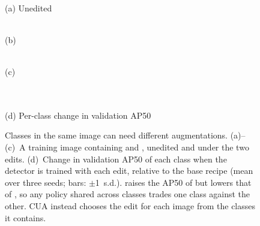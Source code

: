\begin{figure}[t]
\centering
\setlength{\fboxsep}{0pt}
\begin{minipage}[t]{0.32\columnwidth}\centering
{}\\[1pt]
{\footnotesize (a) Unedited}
\end{minipage}\hfill
\begin{minipage}[t]{0.32\columnwidth}\centering
{}\\[1pt]
{\footnotesize (b) }
\end{minipage}\hfill
\begin{minipage}[t]{0.32\columnwidth}\centering
{}\\[1pt]
{\footnotesize (c) }
\end{minipage}\\[5pt]
\\[1pt]
{\footnotesize (d) Per-class change in validation AP50}
\caption[Classes in one image can need different augmentations]{Classes in the same image can need different augmentations. (a)--(c)~A  training image containing  and , unedited and under the two edits. (d)~Change in validation AP50 of each class when the detector is trained with each edit, relative to the base recipe (mean over three seeds; bars: $\pm$1~s.d.).  raises the AP50 of  but lowers that of , so any policy shared across classes trades one class against the other. CUA instead chooses the edit for each image from the classes it contains.}
\label{fig:teaser}
\end{figure}
